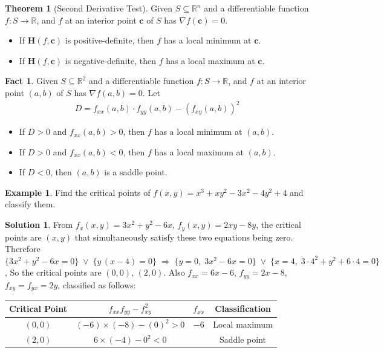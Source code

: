\documentclass[10pt]{extarticle}
\newcommand{\ds}{\displaystyle}
\newcommand{\ie}{\;\Longrightarrow\;}
\newcommand{\orr}{\;\vee\;}
\theoremstyle{definition}
\newtheorem*{thm}{Theorem}
\newtheorem*{ex}{Example}
\newtheorem*{sol}{Solution}
\newtheorem*{fact}{Fact}
\newcommand{\vc}{\mathbf{c}}
\newcommand{\vH}{\mathbf{H}}
\begin{document}
\newpage

\begin{thm}[Second Derivative Test]
  Given $\ds S\subseteq\mathbb{R}^n$ and a differentiable function $\ds f:S\to\mathbb{R}$, and $f$ at an interior point $\vc$ of $S$ has $\ds\nabla f(\vc) = 0$. 
  \begin{itemize}%
    \item If $\vH(f, \vc)$ is positive-definite, then $f$ has a local minimum at $\vc$. 
    \item If $\vH(f, \vc)$ is negative-definite, then $f$ has a local maximum at $\vc$. 
  \end{itemize}
\end{thm}

\begin{fact}
  Given $\ds S\subseteq\mathbb{R}^2$ and a differentiable function $\ds f:S\to\mathbb{R}$, and $f$ at an interior point $(a, b)$ of $S$ has $\ds\nabla f(a, b) = 0$. Let 
  \begin{align*}
    D = f_{xx}(a, b)\cdot f_{yy}(a, b) - (f_{xy}(a, b))^2
  \end{align*}
  \begin{itemize}%
    \item If $D > 0$ and $\ds f_{xx}(a, b) > 0$, then $f$ has a local minimum at $(a, b)$. 
    \item If $D > 0$ and $\ds f_{xx}(a, b) < 0$, then $f$ has a local maximum at $(a, b)$. 
    \item If $D < 0$, then $(a, b)$ is a saddle point. 
  \end{itemize}
\end{fact}

\newpage

\begin{ex} 
  Find the critical points of $\ds f(x, y) = x^3 + xy^2 - 3x^2 - 4y^2 + 4$ and classify them. 
\end{ex}

\begin{sol} From $\ds f_x(x, y) = 3x^2 + y^2 - 6x$, $\ds f_y(x, y) = 2xy - 8y$, the critical points are $(x, y)$ that simultaneously satisfy these two equations being zero. Therefore $\ds\big\{3x^2 + y^2 - 6x = 0\big\} \orr \big\{y\,(x - 4) = 0\big\} \ie \big\{y = 0,\;3x^2 - 6x = 0\big\}\orr\big\{x = 4,\;3\cdot 4^2 + y^2 + 6\cdot 4 = 0\big\}$, So the critical points are $(0, 0)$, $(2, 0)$. Also $\ds f_{xx} = 6x - 6$, $\ds f_{yy} = 2x - 8$, $\ds f_{xy} = f_{yx} = 2y$, classified as follows: 
  \begin{center}
  \begin{tabular}{cccc}
    \toprule
    Critical Point   & $f_{xx}f_{yy}-f_{xy}^2$ & $f_{xx}$ & Classification \\    
    \midrule
    $(0, 0)$ & $(-6)\times(-8) - (0)^2 > 0$ & $-6$ & Local maximum \\ 
    $(2, 0)$ & $6\times(-4) - 0^2 < 0$      &      & Saddle point \\ \bottomrule
  \end{tabular}
  \end{center}
\end{sol}
\end{document}
